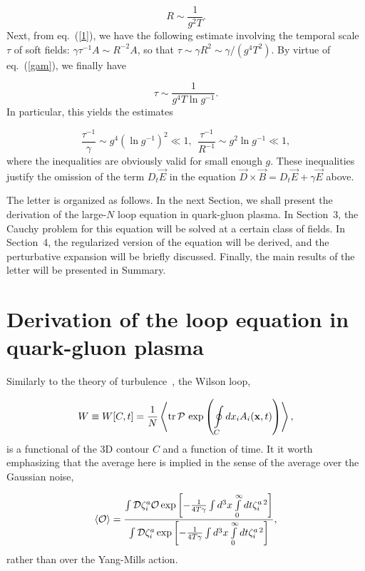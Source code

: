 \documentclass[a4paper,12pt]{article}
\begin{document}
\begin{equation}
\label{spa}
R\sim\frac{1}{g^2T}.
\end{equation}
Next, from eq.~(\ref{1}), we have the following estimate involving the temporal scale $\tau$ of soft fields: $\gamma\tau^{-1}A\sim
R^{-2}A$, so that $\tau\sim\gamma R^2\sim\gamma/\left(g^4T^2\right)$. By virtue of eq.~(\ref{gam}),
we finally have

\begin{equation}
\label{tem}
\tau\sim\frac{1}{g^4T\ln g^{-1}}.
\end{equation}
In particular, this yields the estimates


$$
\frac{\tau^{-1}}{\gamma}\sim g^4\left(\ln g^{-1}\right)^2\ll1,~~
\frac{\tau^{-1}}{R^{-1}}\sim g^2\ln g^{-1}\ll1,$$
where the inequalities are obviously valid for small enough $g$. These inequalities justify
the omission of the term $D_t\vec E$ in the equation $\vec D\times\vec B=D_t\vec E+\gamma\vec E$ above.

The letter is organized as follows. In the next Section, we shall present the derivation of the large-$N$ loop equation in
quark-gluon plasma. In Section~3, the Cauchy problem for this equation will be solved at a certain class of fields.
In Section~4, the regularized version of the equation will be derived, and the perturbative expansion will be briefly
discussed. Finally, the main results of the letter will be presented in Summary.



\section{Derivation of the loop equation in quark-gluon plasma}

Similarly to the theory of turbulence~\cite{tur1}, the Wilson loop,

$$W\equiv W[C,t]=\frac{1}{N}\left<{\rm tr}{\,}{\cal P}{\,}\exp
\left(\oint\limits_{C}^{} dx_i A_i({\bf x},t)\right)\right>,$$
is a functional of the 3D contour $C$ and a function of time. It it worth emphasizing that the average here is implied in the
sense of the average over the Gaussian noise,

$$\left<{\cal O}\right>=\frac{\int {\cal D}\zeta_i^a{\cal O}\exp\left[-\frac{1}{4T\gamma}\int d^3x\int\limits_{0}^{\infty}dt
\zeta_i^{a{\,}2}\right]}{\int {\cal D}\zeta_i^a\exp\left[-\frac{1}{4T\gamma}\int d^3x\int\limits_{0}^{\infty}dt
\zeta_i^{a{\,}2}\right]},$$
rather than over the Yang-Mills action.
\end{document}
